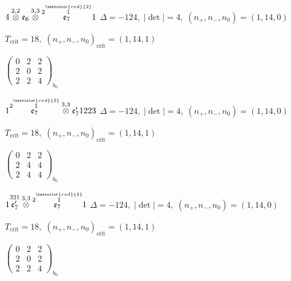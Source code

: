 \documentclass[10pt]{article}
\begin{document}
\smallskip

$4\overset{2,2}{\otimes}\mathfrak{e}_6\overset{3,3}{\otimes}\overset{2\overset{\textcolor{red}{2}}{1}}{\mathfrak{e}_7}1$ \quad $\Delta=-124,\; |\det|=4,\; (n_+,n_-,n_0)=(1,14,0)$

\hspace{1em}$T_{\text{crit}}=18,\; (n_+,n_-,n_0)_{\text{crit}}=(1,14,1)$

\hspace{2em}$\left(\begin{smallmatrix}0 & 2 & 2 \\ 2 & 0 & 2 \\ 2 & 2 & 4\end{smallmatrix}\right)_{\!b_0}$

\smallskip

$1\overset{2\overset{\textcolor{red}{2}}{1}}{\mathfrak{e}_7}\overset{3,3}{\otimes}\mathfrak{e}_7'1223$ \quad $\Delta=-124,\; |\det|=4,\; (n_+,n_-,n_0)=(1,14,0)$

\hspace{1em}$T_{\text{crit}}=18,\; (n_+,n_-,n_0)_{\text{crit}}=(1,14,1)$

\hspace{2em}$\left(\begin{smallmatrix}0 & 2 & 2 \\ 2 & 4 & 4 \\ 2 & 4 & 4\end{smallmatrix}\right)_{\!b_0}$

\smallskip

$1\overset{321}{\mathfrak{e}_7'}\overset{3,3}{\otimes}\overset{2\overset{\textcolor{red}{2}}{1}}{\mathfrak{e}_7}1$ \quad $\Delta=-124,\; |\det|=4,\; (n_+,n_-,n_0)=(1,14,0)$

\hspace{1em}$T_{\text{crit}}=18,\; (n_+,n_-,n_0)_{\text{crit}}=(1,14,1)$

\hspace{2em}$\left(\begin{smallmatrix}0 & 2 & 2 \\ 2 & 0 & 2 \\ 2 & 2 & 4\end{smallmatrix}\right)_{\!b_0}$
\end{document}
